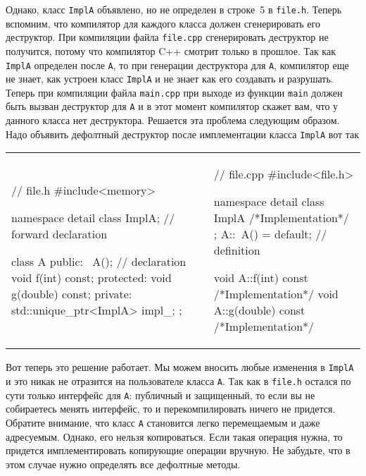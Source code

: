 Однако, класс \verb"ImplA" объявлено, но не определен в строке~5 в \verb"file.h".
Теперь вспомним, что компилятор для каждого класса должен сгенерировать его деструктор.
При компиляции файла \verb"file.cpp" сгенерировать деструктор не получится, потому что компилятор C++ смотрит только в прошлое.
Так как \verb"ImplA" определен после \verb"A", то при генерации деструктора для \verb"A", компилятор еще не знает, как устроен класс \verb"ImplA" и не знает как его создавать и разрушать.
Теперь при компиляции файла \verb"main.cpp" при выходе из функции \verb"main" должен быть вызван деструктор для \verb"A" и в этот момент компилятор скажет вам, что у данного класса нет деструктора.
Решается эта проблема следующим образом.
Надо объявить дефолтный деструктор после имплементации класса \verb"ImplA" вот так
\begin{center}
\begin{tabular}{ll}
{
\begin{minipage}[\baselineskip]{8cm}
\begin{cppcode}[numbers = none]
// file.h
#include<memory>

namespace detail {
class ImplA; // forward declaration
}

class A {
public:
  ~A();  // declaration
  void f(int) const;
protected:
  void g(double) const;
private:
  std::unique_ptr<ImplA> impl_;
};
\end{cppcode}
\end{minipage}
}&{
\begin{minipage}[\baselineskip]{8cm}
\begin{cppcode}[numbers = none]
// file.cpp
#include<file.h>

namespace detail {
class ImplA {
  /*Implementation*/
};
}
A::~A() = default;  // definition

void A::f(int) const {
  /*Implementation*/
}
void A::g(double) const {
  /*Implementation*/
}
\end{cppcode}
\end{minipage}
}\\
\end{tabular}
\end{center}
Вот теперь это решение работает.
Мы можем вносить любые изменения в \verb"ImplA" и это никак не отразится на пользователе класса \verb"A".
Так как в \verb"file.h" остался по сути только интерфейс для \verb"A": публичный и защищенный, то если вы не собираетесь менять интерфейс, то и перекомпилировать ничего не придется.
Обратите внимание, что класс \verb"A" становится легко перемещаемым и даже адресуемым.
Однако, его нельзя копироваться.
Если такая операция нужна, то придется имплементировать копирующие операции вручную.
Не забудьте, что в этом случае нужно определять все дефолтные методы.

